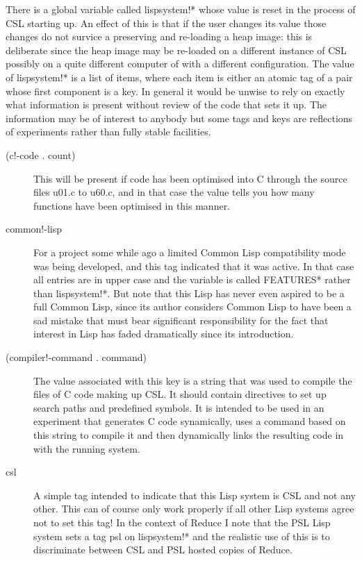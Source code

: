 \documentclass[a4paper,11pt]{article}
\begin{document}
There is a global variable called {\ttfamily lispsystem!*} whose value is
reset in the process of CSL starting up. An effect of this is that if the
user changes its value those changes do not survice a preserving and
re-loading a heap image: this is deliberate since the heap image may be
re-loaded on a different instance of CSL possibly on a quite different
computer of with a different configuration. The value of {\ttfamily
lispsystem!*} is a list of items, where each item is either an atomic tag
of a pair whose first component is a key. In general it would be unwise
to rely on exactly what information is present without review of the code
that sets it up. The information may be of interest to anybody but some tags
and keys are reflections of experiments rather than fully stable facilities.
\begin{description}

\item[{\ttfamily (c!-code . count)}] 
This will be present if code has been optimised into C through the source
files u01.c to u60.c, and in that case the value tells you how many functions
have been optimised in this manner.
  

\item[{\ttfamily  common!-lisp}] 
For a project some while ago a limited Common Lisp compatibility mode was
being developed, and this tag indicated that it was active. In that case all
entries are in upper case and the variable is called {\ttfamily *FEATURES*}
rather than {\ttfamily lispsystem!*}. But note that this Lisp has never even
aspired to be a full Common Lisp, since its author considers Common Lisp to
have been a sad mistake that must bear significant responsibility for the
fact that interest in Lisp has faded dramatically since its introduction.
  

\item[{\ttfamily (compiler!-command . command)}] 
The value associated with this key is a string that was used to compile the
files of C code making up CSL. It should contain directives to set up
search paths and predefined symbols. It is intended to be used in an
experiment that generates C code synamically, uses a command based on this
string to compile it and then dynamically links the resulting code in with
the running system.

\item[{\ttfamily csl}] 
A simple tag intended to indicate that this Lisp system is CSL and not any
other. This can of course only work properly if all other Lisp systems
agree not to set this tag! In the context of Reduce I note that the PSL
Lisp system sets a tag {\ttfamily psl} on {\ttfamily lispsystem!*} and
the realistic use of this is to discriminate between CSL and PSL hosted
copies of Reduce.


\end{description}
\end{document}

